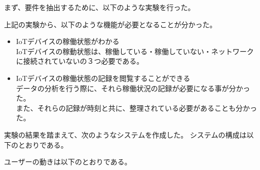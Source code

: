 まず、要件を抽出するために、以下のような実験を行った。

上記の実験から、以下のような機能が必要となることが分かった。

\begin{itemize}
	\item IoTデバイスの稼働状態がわかる\\
		IoTデバイスの稼動状態は、稼働している・稼働していない・ネットワークに接続されていないの３つ必要である。
	\item IoTデバイスの稼働状態の記録を閲覧することができる\\
		データの分析を行う際に、それら稼働状況の記録が必要になる事が分かった。\\
		また、それらの記録が時刻と共に、整理されている必要があることも分かった。
\end{itemize}

実験の結果を踏まえて、次のようなシステムを作成した。
システムの構成は以下のとおりである。



ユーザーの動きは以下のとおりである。




